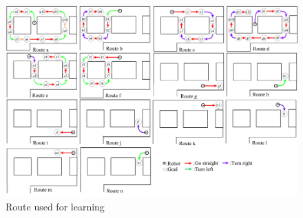 \documentclass{sice-si}
\begin{document}
\printbibliography[title=参考文献]
\begin{figure}[t]
    \centering
     \includegraphics[width=160mm]{./figs/newroute.pdf}
     \caption{Route used for learning}\label{fig:newroute}
\end{figure}
\end{document}
